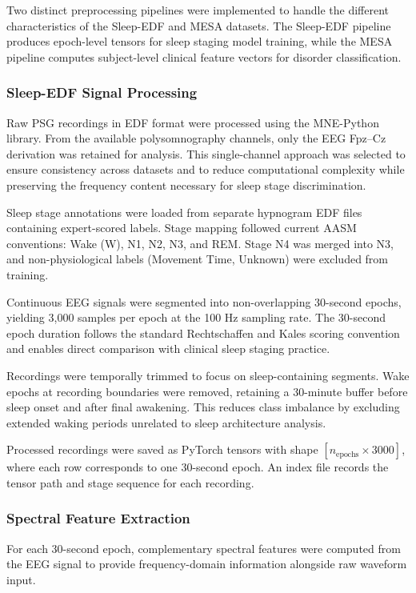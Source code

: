 \documentclass[pdflatex,sn-mathphys-num]{sn-jnl}%
\theoremstyle{thmstyleone}%
\theoremstyle{thmstyletwo}%
\theoremstyle{thmstylethree}%
\begin{document}
Two distinct preprocessing pipelines were implemented to handle the different characteristics of the Sleep-EDF and MESA datasets. The Sleep-EDF pipeline produces epoch-level tensors for sleep staging model training, while the MESA pipeline computes subject-level clinical feature vectors for disorder classification.

\subsubsection{Sleep-EDF Signal Processing}

Raw PSG recordings in EDF format were processed using the MNE-Python library. From the available polysomnography channels, only the EEG Fpz--Cz derivation was retained for analysis. This single-channel approach was selected to ensure consistency across datasets and to reduce computational complexity while preserving the frequency content necessary for sleep stage discrimination.

Sleep stage annotations were loaded from separate hypnogram EDF files containing expert-scored labels. Stage mapping followed current AASM conventions: Wake (W), N1, N2, N3, and REM. Stage N4 was merged into N3, and non-physiological labels (Movement Time, Unknown) were excluded from training.

Continuous EEG signals were segmented into non-overlapping 30-second epochs, yielding 3,000 samples per epoch at the 100 Hz sampling rate. The 30-second epoch duration follows the standard Rechtschaffen and Kales scoring convention and enables direct comparison with clinical sleep staging practice.

Recordings were temporally trimmed to focus on sleep-containing segments. Wake epochs at recording boundaries were removed, retaining a 30-minute buffer before sleep onset and after final awakening. This reduces class imbalance by excluding extended waking periods unrelated to sleep architecture analysis.

Processed recordings were saved as PyTorch tensors with shape $[n_{\text{epochs}} \times 3000]$, where each row corresponds to one 30-second epoch. An index file records the tensor path and stage sequence for each recording.

\subsubsection{Spectral Feature Extraction}

For each 30-second epoch, complementary spectral features were computed from the EEG signal to provide frequency-domain information alongside raw waveform input.
\end{document}

